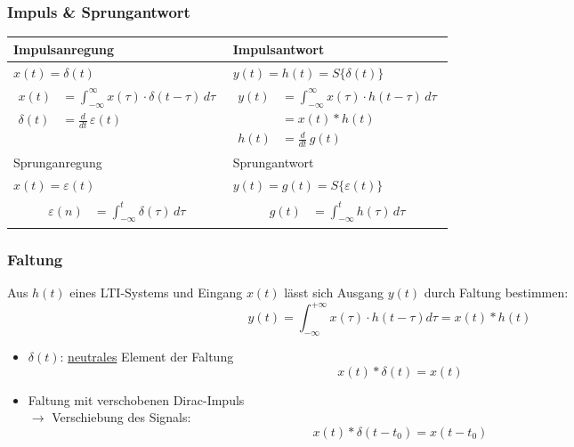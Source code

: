 \subsubsection{Impuls \& Sprungantwort}
\small
\begin{centering}
	\setlength{\abovedisplayskip}{-10pt}
	\setlength{\belowdisplayskip}{-5pt}
	\begin{tabularx}{\columnwidth}{|X|X|}
		\hline
		Impulsanregung & Impulsantwort\\
		\hline
		$x(t)=\delta(t)$ & $y(t)= h(t) = S\{ \delta(t) \}$ \\
		\hline
		{
			\begin{align*}
				x(t) &= \int_{-\infty}^{\infty}x(\tau) \cdot \delta(t-\tau) \, d\tau\\
				\delta(t) &= \frac{d}{dt} \, \varepsilon(t)
			\end{align*}
		}	 &
		{
			\begin{align*}	
				y(t) &= \int_{-\infty}^{\infty}x(\tau) \cdot h(t-\tau) \, d\tau\\
				&= x(t) * h(t)\\
				h(t) &= \frac{d}{dt} \, g(t)
			\end{align*}
		}	\\
		\hline\hline
		Sprunganregung & Sprungantwort \\
		\hline
		$x(t)=\varepsilon(t)$ & $y(t)= g(t) = S\{ \varepsilon(t) \}$ \\
		\hline
		{
			\begin{align*}	
				\varepsilon(n) &= \int_{-\infty}^{t} \delta(\tau) \, d\tau
			\end{align*}
		} &
		{
			\begin{align*}	
			g(t) &= \int_{-\infty}^{t} h(\tau) \, d\tau
			\end{align*}
		}\\
		\hline
	\end{tabularx}
\end{centering}
\normalsize
\subsubsection{Faltung}
\small
Aus $h(t)$ eines LTI-Systems und Eingang $x(t)$ lässt sich
Ausgang $y(t)$ durch Faltung bestimmen:
\normalsize
  \[
      y(t) = \int_{-\infty}^{+\infty} x(\tau)\cdot h(t-\tau)d\tau = \boxed{x(t)*h(t)}
  \]
  \begin{itemize}
  	  \item $\delta(t)$: \underline{neutrales} Element der Faltung
  	  \[
  	  x(t)* \delta(t) = x(t)
  	  \]
  	\item Faltung mit verschobenen Dirac-Impuls \\$\rightarrow$ Verschiebung des Signals:
  	\[
  	x(t)* \delta(t - t_0) = x(t - t_0)
  	\]
  \end{itemize}

